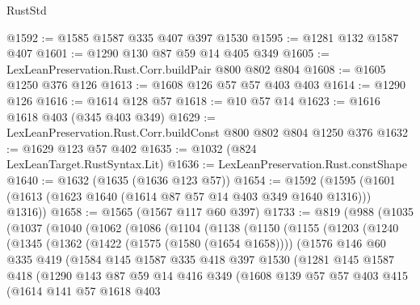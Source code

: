 \begin{lexlean}{RustStd}
\begin{coremodule}
{\begin{coremodule}
{{{{{{{{{@1592 := @1585 @1587 @335 @407 @397 @1530
@1595 := @1281 @132 @1587 @407
@1601 := @1290 @130 @87 @59 @14 @405 @349
@1605 := LexLeanPreservation.Rust.Corr.buildPair @800 @802 @804
@1608 := @1605 @1250 @376 @126
@1613 := @1608 @126 @57 @57 @403 @403
@1614 := @1290 @126
@1616 := @1614 @128 @57
@1618 := @10 @57 @14
@1623 := @1616 @1618 @403 (@345 @403 @349)
@1629 := LexLeanPreservation.Rust.Corr.buildConst @800 @802 @804 @1250 @376
@1632 := @1629 @123 @57 @402
@1635 := @1032 (@824 LexLeanTarget.RustSyntax.Lit)
@1636 := LexLeanPreservation.Rust.constShape
@1640 := @1632 (@1635 (@1636 @123 @57))
@1654 := @1592 (@1595 (@1601 (@1613 (@1623 @1640 (@1614 @87 @57 @14 @403 @349 @1640 @1316))) @1316))
@1658 := @1565 (@1567 @117 @60 @397)
@1733 := @819
    (@988
      (@1035
        (@1037
          (@1040
            (@1062
              (@1086
                (@1104
                  (@1138
                    (@1150
                      (@1155
                        (@1203
                          (@1240
                            (@1345
                              (@1362
                                (@1422 (@1575 (@1580 (@1654 @1658))))
                                (@1576
                                  @146
                                  @60
                                  @335
                                  @419
                                  (@1584
                                    @145
                                    @1587
                                    @335
                                    @418
                                    @397
                                    @1530
                                    (@1281
                                      @145
                                      @1587
                                      @418
                                      (@1290
                                        @143
                                        @87
                                        @59
                                        @14
                                        @416
                                        @349
                                        (@1608
                                          @139
                                          @57
                                          @57
                                          @403
                                          @415
                                          (@1614
                                            @141
                                            @57
                                            @1618
                                            @403
}}}}}}}}}
\end{coremodule}}
\end{coremodule}
\end{lexlean}
